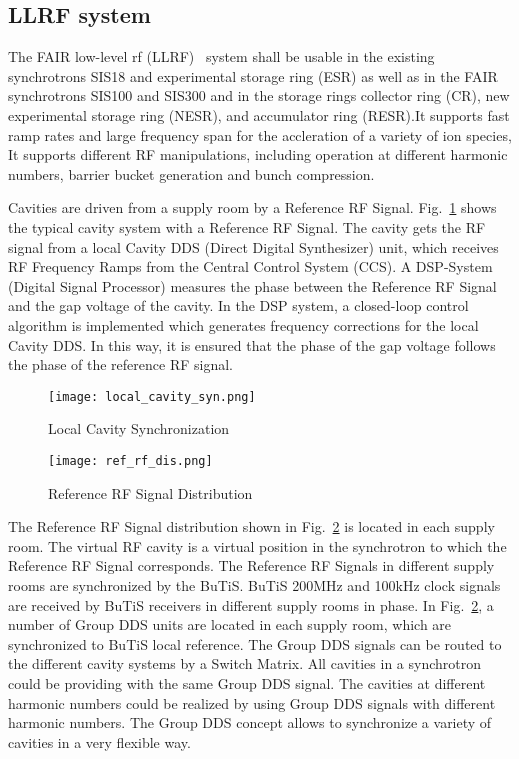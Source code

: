 \subsection{LLRF system}
The FAIR low-level rf (\gls{LLRF})~\cite{klingbeil_new_2011} system shall be usable in the existing synchrotrons SIS18 and experimental storage ring (\gls{ESR}) as well as in the FAIR synchrotrons SIS100 and SIS300 and in the storage rings collector ring (\gls{CR}), new experimental storage ring (\gls{NESR}), and accumulator ring (\gls{RESR}).It supports fast ramp rates and large frequency span for the accleration of a variety of ion species, It supports different RF manipulations, including operation at different harmonic numbers, barrier bucket generation and bunch compression. 

Cavities are driven from a supply room by a Reference RF Signal. Fig.~\ref{local_cavity_syn} shows the typical cavity system with a Reference RF Signal. The cavity gets the RF signal from a local Cavity DDS (Direct Digital Synthesizer) unit, which receives RF Frequency Ramps from the Central Control System (\gls{CCS}). A \gls{DSP}-System (Digital Signal Processor) measures the phase between the Reference RF Signal and the gap voltage of the cavity. In the DSP system, a closed-loop control algorithm is implemented which generates frequency corrections for the local Cavity DDS. In this way, it is ensured that the phase of the gap voltage follows the phase of the reference RF signal. 
\begin{figure}[!htb]
   \centering   
   \texttt{[image: local\_cavity\_syn.png]}
   \caption{Local Cavity Synchronization}
   \label{local_cavity_syn}
\end{figure}
\begin{figure}[!htb]
   \centering   
   \texttt{[image: ref\_rf\_dis.png]}
   \caption{Reference RF Signal Distribution}
   \label{ref_rf_dis}
\end{figure}
The Reference RF Signal distribution shown in Fig.~\ref{ref_rf_dis} is located in each supply room. The virtual RF cavity is a virtual position in the synchrotron to which the Reference RF Signal corresponds. The Reference RF Signals in different supply rooms are synchronized by the BuTiS. BuTiS 200MHz and 100kHz clock signals are received by BuTiS receivers in different supply rooms in phase. In Fig.~\ref{ref_rf_dis}, a number of Group DDS units are located in each supply room, which are synchronized to BuTiS local reference. The Group DDS signals can be routed to the different cavity systems by a Switch Matrix. All cavities in a synchrotron could be providing with the same Group DDS signal. The cavities at different harmonic numbers could be realized by using Group DDS signals with different harmonic numbers. The Group DDS concept allows to synchronize a variety of cavities in a very flexible way. 

